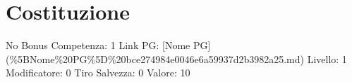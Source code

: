 \section{Costituzione}\label{costituzione}

\begin{description}
\tightlist
\item[Tags: STAT]
No Bonus Competenza: 1 Link PG: {[}Nome PG{]}
(\%5BNome\%20PG\%5D\%20bce274984e0046e6a59937d2b3982a25.md) Livello: 1
Modificatore: 0 Tiro Salvezza: 0 Valore: 10
\end{description}
